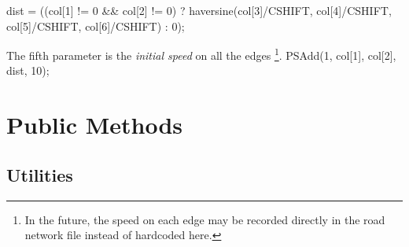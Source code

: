 \documentclass{article}
\def\nwendcode{\endtrivlist \endgroup}
\let\nwdocspar=\par
\theoremstyle{definition}
\begin{document}
dist = ((col[1] != 0 && col[2] != 0)
  ? haversine(col[3]/CSHIFT, col[4]/CSHIFT,
              col[5]/CSHIFT, col[6]/CSHIFT) : 0);
\nwendcode{}\nwdocspar
The fifth parameter is the \textit{initial speed} on all the edges \footnote{In
the future, the speed on each edge may be recorded directly in the road network
file instead of hardcoded here.}.
\nwenddocs{}\endmoddef{}
PSAdd(1, col[1], col[2], dist, 10);
\nwendcode{}\nwdocspar

\section{Public Methods}
\label{sec:public-methods}
\subsection{Utilities}
\label{sec:utilities}
\end{document}

